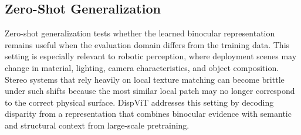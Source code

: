 \subsection{Zero-Shot Generalization}
Zero-shot generalization tests whether the learned binocular representation remains useful when the evaluation domain differs from the training data.
This setting is especially relevant to robotic perception, where deployment scenes may change in material, lighting, camera characteristics, and object composition.
Stereo systems that rely heavily on local texture matching can become brittle under such shifts because the most similar local patch may no longer correspond to the correct physical surface.
DispViT addresses this setting by decoding disparity from a representation that combines binocular evidence with semantic and structural context from large-scale pretraining.


